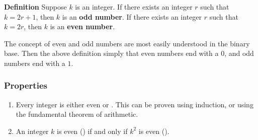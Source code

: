 \documentclass[12pt]{article}
\begin{document}
{\bf Definition} Suppose $k$ is an integer. 
If there exists an integer $r$ such that $k=2r+1$, then $k$ is an {\bf odd number}. 
If there exists an integer $r$ such that $k=2r$, then $k$ is an {\bf even number}. 

The concept of even and odd numbers are most easily understood in 
the binary base. Then the above definition simply  that even numbers end
with a $0$, and odd numbers end with a $1$.

\subsubsection{Properties}
\begin{enumerate}
\item Every integer is either even or . This can be proven
using induction, or using the fundamental theorem of arithmetic.
\item An integer $k$ is even () if and only if $k^2$ is even ().
\end{enumerate}
\end{document}
